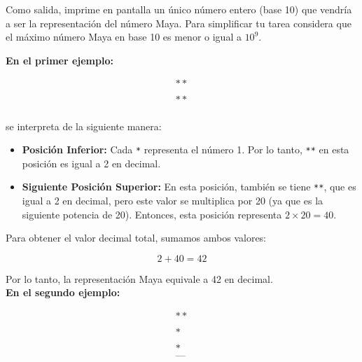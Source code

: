 \outputText

Como salida, imprime en pantalla un \'unico n\'umero entero (base 10) que vendr\'ia a ser la representaci\'on del n\'umero Maya. Para simplificar tu tarea considera que el m\'aximo n\'umero Maya en base 10 es menor o igual a $10^9$.

\exampleCases

\begin{example}
\end{example}

\explanationText

\textbf{En el primer ejemplo:}

\[
\begin{array}{c}
** \\
\\
** \\
\end{array}
\]

se interpreta de la siguiente manera:

\begin{itemize}
    \item \textbf{Posición Inferior:} Cada \texttt{*} representa el número 1. Por lo tanto, \texttt{**} en esta posición es igual a 2 en decimal.
    \item \textbf{Siguiente Posición Superior:} En esta posición, también se tiene \texttt{**}, que es igual a 2 en decimal, pero este valor se multiplica por 20 (ya que es la siguiente potencia de 20). Entonces, esta posición representa $2 \times 20 = 40$.
\end{itemize}

Para obtener el valor decimal total, sumamos ambos valores:

\[
2 + 40 = 42
\]

Por lo tanto, la representación Maya equivale a 42 en decimal.\\

\textbf{En el segundo ejemplo:}

\[
\begin{array}{c}
** \\
\\
*
\\
\\
* \\
\texttt{---} \\
\end{array}
\]

